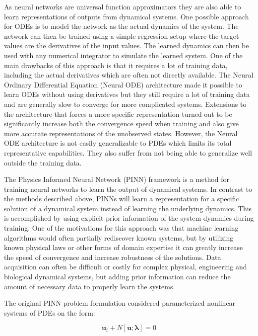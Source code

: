 As neural networks are universal function approximators they are also able to learn representations of outputs from dynamical systems. One possible approach for ODEs is to model the network as the actual dynamics of the system. The network can then be trained using a simple regression setup where the target values are the derivatives of the input values. The learned dynamics can then be used with any numerical integrator to simulate the learned system. One of the main drawbacks of this approach is that it requires a lot of training data, including the actual derivatives which are often not directly available. The Neural Ordinary Differential Equation (Neural ODE) architecture \cite{node} \cite{dupont2019augmented} \cite{massaroli2021dissecting} made it possible to learn ODEs without using derivatives but they still require a lot of training data and are generally slow to converge for more complicated systems. Extensions to the architecture \cite{hamiltoniannode} \cite{lagrangiannode} \cite{sonode} that forces a more specific representation turned out to be significantly increase both the convergence speed when training and also give more accurate representations of the unobserved states. However, the Neural ODE architecture is not easily generalizable to PDEs which limits its total representative capabilities. They also suffer from not being able to generalize well outside the training data.

The Physics Informed Neural Network (PINN) framework \cite{pinn1} \cite{pinn2} \cite{pinn} is a method for training neural networks to learn the output of dynamical systems. In contrast to the methods described above, PINNs will learn a representation for a specific solution of a dynamical system instead of learning the underlying dynamics. This is accomplished by using explicit prior information of the system dynamics during training. One of the motivations for this approach was that machine learning algorithms would often partially rediscover known systems, but by utilizing known physical laws or other forms of domain expertise it can greatly increase the speed of convergence and increase robustness of the solutions. Data acquisition can often be difficult or costly for complex physical, engineering and biological dynamical systems, but adding prior information can reduce the amount of necessary data to properly learn the systems.

The original PINN problem formulation considered parameterized nonlinear systems of PDEs on the form:

\begin{equation}
    \bm{u}_t + N[\bm{u}; \bm{\lambda}] = 0
    \label{eq:pinnpde}
\end{equation}

